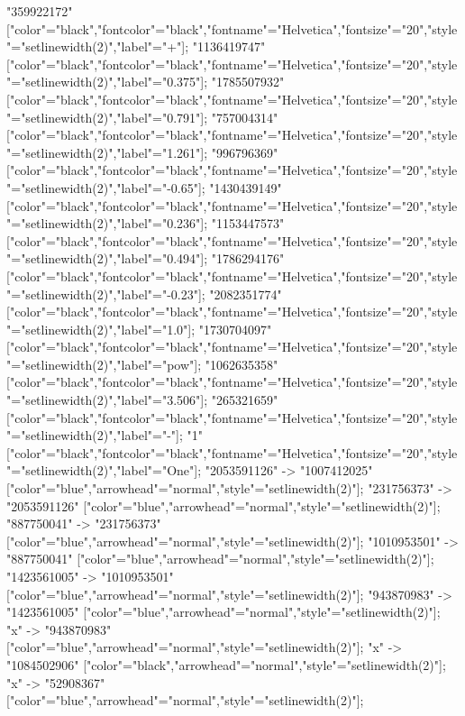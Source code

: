 {    "359922172" ["color"="black","fontcolor"="black","fontname"="Helvetica","fontsize"="20","style"="setlinewidth(2)","label"="+"];
    "1136419747" ["color"="black","fontcolor"="black","fontname"="Helvetica","fontsize"="20","style"="setlinewidth(2)","label"="0.375"];
    "1785507932" ["color"="black","fontcolor"="black","fontname"="Helvetica","fontsize"="20","style"="setlinewidth(2)","label"="0.791"];
    "757004314" ["color"="black","fontcolor"="black","fontname"="Helvetica","fontsize"="20","style"="setlinewidth(2)","label"="1.261"];
    "996796369" ["color"="black","fontcolor"="black","fontname"="Helvetica","fontsize"="20","style"="setlinewidth(2)","label"="-0.65"];
    "1430439149" ["color"="black","fontcolor"="black","fontname"="Helvetica","fontsize"="20","style"="setlinewidth(2)","label"="0.236"];
    "1153447573" ["color"="black","fontcolor"="black","fontname"="Helvetica","fontsize"="20","style"="setlinewidth(2)","label"="0.494"];
    "1786294176" ["color"="black","fontcolor"="black","fontname"="Helvetica","fontsize"="20","style"="setlinewidth(2)","label"="-0.23"];
    "2082351774" ["color"="black","fontcolor"="black","fontname"="Helvetica","fontsize"="20","style"="setlinewidth(2)","label"="1.0"];
    "1730704097" ["color"="black","fontcolor"="black","fontname"="Helvetica","fontsize"="20","style"="setlinewidth(2)","label"="pow"];
    "1062635358" ["color"="black","fontcolor"="black","fontname"="Helvetica","fontsize"="20","style"="setlinewidth(2)","label"="3.506"];
    "265321659" ["color"="black","fontcolor"="black","fontname"="Helvetica","fontsize"="20","style"="setlinewidth(2)","label"="-"];
    "1" ["color"="black","fontcolor"="black","fontname"="Helvetica","fontsize"="20","style"="setlinewidth(2)","label"="One"];
    "2053591126" -> "1007412025" ["color"="blue","arrowhead"="normal","style"="setlinewidth(2)"];
    "231756373" -> "2053591126" ["color"="blue","arrowhead"="normal","style"="setlinewidth(2)"];
    "887750041" -> "231756373" ["color"="blue","arrowhead"="normal","style"="setlinewidth(2)"];
    "1010953501" -> "887750041" ["color"="blue","arrowhead"="normal","style"="setlinewidth(2)"];
    "1423561005" -> "1010953501" ["color"="blue","arrowhead"="normal","style"="setlinewidth(2)"];
    "943870983" -> "1423561005" ["color"="blue","arrowhead"="normal","style"="setlinewidth(2)"];
    "x" -> "943870983" ["color"="blue","arrowhead"="normal","style"="setlinewidth(2)"];
    "x" -> "1084502906" ["color"="black","arrowhead"="normal","style"="setlinewidth(2)"];
    "x" -> "52908367" ["color"="blue","arrowhead"="normal","style"="setlinewidth(2)"];
}
